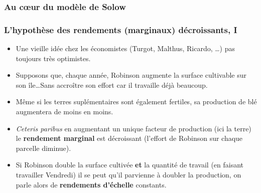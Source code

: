\documentclass[10pt,notheorems]{beamer}
\theoremstyle{plain}
\theoremstyle{definition} %
\begin{document}
\begin{frame}
  \frametitle{Au c\oe{}ur du modèle de Solow}

  \begin{center}
    \quad{}
  \end{center}

\end{frame}


\begin{frame}
  \frametitle{L'hypothèse des rendements (marginaux) décroissants, I}

  \begin{itemize}

  \item Une vieille idée chez les économistes (Turgot, Malthus, Ricardo, \ldots) pas toujours très optimistes.\newline

  \item Supposons que, chaque année, Robinson augmente la surface cultivable sur son île\ldots Sans accroître son effort car il travaille déjà beaucoup.\newline

  \item Même si les terres suplémentaires sont également fertiles, sa production de blé augmentera de moins en moins.\newline

  \item \emph{Ceteris paribus} en augmentant un unique facteur de production (ici la terre) le \textbf{rendement marginal} est décroissant (l'effort de Robinson sur chaque parcelle diminue).\newline

  \item[\dbend] Si Robinson double la surface cultivée \textbf{et} la quantité de travail (en faisant travailler Vendredi) il se peut qu'il parvienne à doubler la production, on parle alors de \textbf{rendements d'échelle} constants.

  \end{itemize}

\end{frame}
\end{document}
